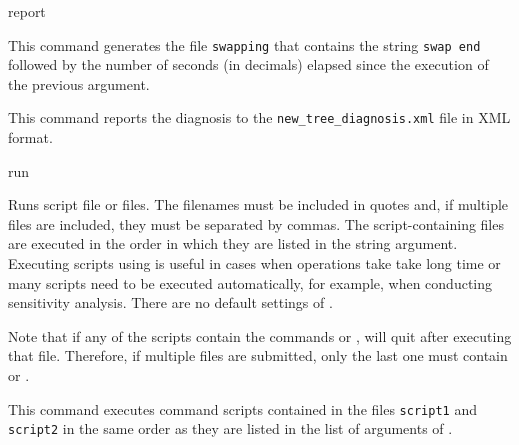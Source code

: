 \begin{command}{report}{}
\begin{poyexamples}
          {This command generates the file \texttt{swapping} that contains
          the string \texttt{swap end} followed by the number of seconds (in
          decimals) elapsed since the execution of the previous 
          argument.}
          
         {This command reports the diagnosis to the \texttt{new\_tree\_diagnosis.xml}
         file in XML format.}

	\end{poyexamples}

	\begin{poyalso}
	 \end{poyalso}

\end{command}

\begin{command}{run}{}

	\syntax{\obligatory{(\poystring)}}

	\begin{poydescription}
        Runs \poy script file or files. The filenames must be included in
        quotes and, if multiple files are included, they must be separated by commas.
        The script-containing files are executed in the order in which they are listed
        in the string argument.
        Executing scripts using  is useful in cases when
        operations take take long time or many scripts need to be executed automatically,
        for example, when conducting sensitivity analysis\cite{wheeler1995}.
        There are no default settings of .
        \end{poydescription}
        
        \begin{statement}
  	Note that if any of the scripts contain the commands  or
	, \poy will quit after executing that file. Therefore, if
	multiple files are submitted, only the last one must contain \poycommand{exit()}
	or \poycommand{quit()}.
	\end{statement}
	
	\begin{poyexamples}
            {This command executes \poy command scripts contained in the files \texttt{script1}
            and \texttt{script2} in the same order as they are listed in the list of arguments of
            .}
          \end{poyexamples}
          
          \begin{poyalso}
        		\cross{exit}
		\cross{quit}
	\end{poyalso}

\end{command}

